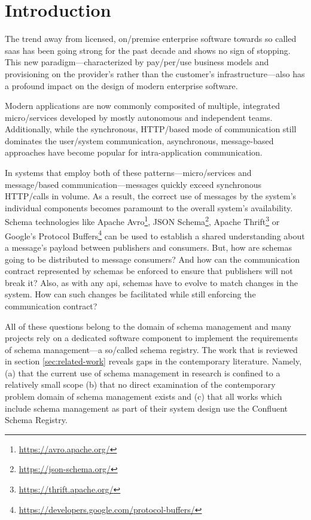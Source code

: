 
\section{Introduction}\label{sec:introduction}



The trend away from licensed, on\-/premise enterprise software towards so called \gls{saas} has been going strong for the past decade and shows no sign of stopping.
This new paradigm---characterized by pay\-/per\-/use business models and provisioning on the provider's rather than the customer's infrastructure---also has a profound impact on the design of modern enterprise software.

Modern applications are now commonly composited of multiple, integrated micro\-/services developed by mostly autonomous and independent teams.
Additionally, while the synchronous, HTTP\-/based mode of communication still dominates the user\-/system communication, asynchronous, message-based approaches have become popular for intra-application communication.

In systems that employ both of these patterns---micro\-/services and message\-/based communication---messages quickly exceed synchronous HTTP\-/calls in volume.
As a result, the correct use of messages by the system's individual components becomes paramount to the overall system's availability.
Schema technologies like Apache Avro\footnote{\url{https://avro.apache.org/}}, JSON Schema\footnote{\url{https://json-schema.org/}}, Apache Thrift\footnote{\url{https://thrift.apache.org/}} or Google's Protocol Buffers\footnote{\url{https://developers.google.com/protocol-buffers/}} can be used to establish a shared understanding about a message's payload between publishers and consumers.
But, how are schemas going to be distributed to message consumers?
And how can the communication contract represented by schemas be enforced to ensure that publishers will not break it?
Also, as with any \gls{api}, schemas have to evolve to match changes in the system.
How can such changes be facilitated while still enforcing the communication contract?

All of these questions belong to the domain of schema management and many projects rely on a dedicated software component to implement the requirements of schema management---a so\-/called schema registry.
The work that is reviewed in section \ref{sec:related-work} reveals gaps in the contemporary literature.
Namely, (a) that the current use of schema management in research is confined to a relatively small scope (b) that no direct examination of the contemporary problem domain of schema management exists and (c) that all works which include schema management as part of their system design use the Confluent Schema Registry.

